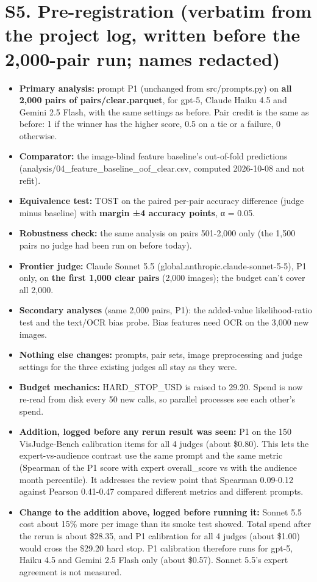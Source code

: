 \documentclass[10pt]{article}
\begin{document}
\section*{S5. Pre-registration (verbatim from the project log, written before the 2,000-pair run; names redacted)}
\begin{itemize}\small
\item \textbf{Primary analysis:} prompt P1 (unchanged from src/prompts.py) on \textbf{all 2,000 pairs of pairs/clear.parquet}, for gpt-5, Claude Haiku 4.5 and Gemini 2.5 Flash, with the same settings as before. Pair credit is the same as before: 1 if the winner has the higher score, 0.5 on a tie or a failure, 0 otherwise.
\item \textbf{Comparator:} the image-blind feature baseline's out-of-fold predictions (analysis/04\_feature\_baseline\_oof\_clear.csv, computed 2026-10-08 and not refit).
\item \textbf{Equivalence test:} TOST on the paired per-pair accuracy difference (judge minus baseline) with \textbf{margin ±4 accuracy points}, α = 0.05.
\item \textbf{Robustness check:} the same analysis on pairs 501-2,000 only (the 1,500 pairs no judge had been run on before today).
\item \textbf{Frontier judge:} Claude Sonnet 5.5 (global.anthropic.claude-sonnet-5-5), P1 only, on \textbf{the first 1,000 clear pairs} (2,000 images); the budget can't cover all 2,000.
\item \textbf{Secondary analyses} (same 2,000 pairs, P1): the added-value likelihood-ratio test and the text/OCR bias probe. Bias features need OCR on the 3,000 new images.
\item \textbf{Nothing else changes:} prompts, pair sets, image preprocessing and judge settings for the three existing judges all stay as they were.
\item \textbf{Budget mechanics:} HARD\_STOP\_USD is raised to 29.20. Spend is now re-read from disk every 50 new calls, so parallel processes see each other's spend.
\item \textbf{Addition, logged before any rerun result was seen:} P1 on the 150 VisJudge-Bench calibration items for all 4 judges (about \$0.80). This lets the expert-vs-audience contrast use the same prompt and the same metric (Spearman of the P1 score with expert overall\_score vs with the audience month percentile). It addresses the review point that Spearman 0.09-0.12 against Pearson 0.41-0.47 compared different metrics and different prompts.
\item \textbf{Change to the addition above, logged before running it:} Sonnet 5.5 cost about 15\% more per image than its smoke test showed. Total spend after the rerun is about \$28.35, and P1 calibration for all 4 judges (about \$1.00) would cross the \$29.20 hard stop. P1 calibration therefore runs for gpt-5, Haiku 4.5 and Gemini 2.5 Flash only (about \$0.57). Sonnet 5.5's expert agreement is not measured.
\end{itemize}
\end{document}
